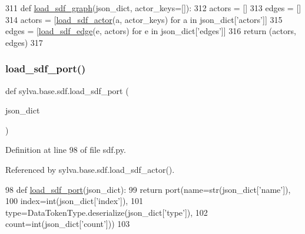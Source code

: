 \begin{DoxyCode}
311     \textcolor{keyword}{def }\hyperlink{namespacesylva_1_1base_1_1sdf_a0bdfa7a81bf9648662631113a609062d}{load\_sdf\_graph}(json\_dict, actor\_keys=[]):
312         actors = []
313         edges = []
314         actors = [\hyperlink{namespacesylva_1_1base_1_1sdf_a14b2bfbb0fd81d1e114b670f13f718f1}{load\_sdf\_actor}(a, actor\_keys) \textcolor{keywordflow}{for} a \textcolor{keywordflow}{in} json\_dict[\textcolor{stringliteral}{'actors'}]]
315         edges = [\hyperlink{namespacesylva_1_1base_1_1sdf_acd1ba464e47476a5205de3e3856fbb83}{load\_sdf\_edge}(e, actors) \textcolor{keywordflow}{for} e \textcolor{keywordflow}{in} json\_dict[\textcolor{stringliteral}{'edges'}]]
316         \textcolor{keywordflow}{return} (actors, edges)
317 
\end{DoxyCode}
\mbox{\label{namespacesylva_1_1base_1_1sdf_a72bbd0e1cd0a666269ac3f17427954b8}} 
\subsubsection{\texorpdfstring{load\+\_\+sdf\+\_\+port()}{load\_sdf\_port()}}
{\footnotesize\ttfamily def sylva.\+base.\+sdf.\+load\+\_\+sdf\+\_\+port (\begin{DoxyParamCaption}\item[{}]{json\+\_\+dict }\end{DoxyParamCaption})}



Definition at line 98 of file sdf.\+py.



Referenced by sylva.\+base.\+sdf.\+load\+\_\+sdf\+\_\+actor().


\begin{DoxyCode}
98     \textcolor{keyword}{def }\hyperlink{namespacesylva_1_1base_1_1sdf_a72bbd0e1cd0a666269ac3f17427954b8}{load\_sdf\_port}(json\_dict):
99         \textcolor{keywordflow}{return} port(name=str(json\_dict[\textcolor{stringliteral}{'name'}]),
100                     index=int(json\_dict[\textcolor{stringliteral}{'index'}]),
101                     type=DataTokenType.deserialize(json\_dict[\textcolor{stringliteral}{'type'}]),
102                     count=int(json\_dict[\textcolor{stringliteral}{'count'}]))
103 
\end{DoxyCode}
\mbox{\label{namespacesylva_1_1base_1_1sdf_a34a38a5853d86a6e49aba53f9040462d}} 
